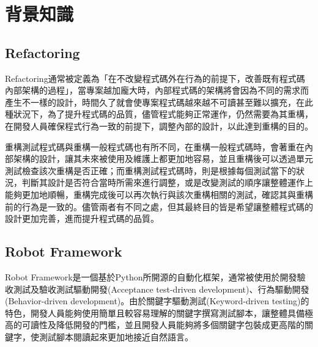 \chapter{背景知識}

\section{Refactoring}
\indent
Refactoring\cite{RefactoringBook}通常被定義為「在不改變程式碼外在行為的前提下，改善既有程式碼內部架構的過程」，當專案越加龐大時，內部程式碼的架構將會因為不同的需求而產生不一樣的設計，時間久了就會使專案程式碼越來越不可讀甚至難以擴充，在此種狀況下，為了提升程式碼的品質，儘管程式能夠正常運作，仍然需要為其重構，在開發人員確保程式行為一致的前提下，調整內部的設計，以此達到重構的目的。

\indent
重構測試程式碼與重構一般程式碼也有所不同，在重構一般程式碼時，會著重在內部架構的設計，讓其未來被使用及維護上都更加地容易，並且重構後可以透過單元測試檢查該次重構是否正確；而重構測試程式碼時，則是根據每個測試當下的狀況，判斷其設計是否符合當時所需來進行調整，或是改變測試的順序讓整體運作上能夠更加地順暢，重構完成後可以再次執行與該次重構相關的測試，確認其與重構前的行為是一致的。儘管兩者有不同之處，但其最終目的皆是希望讓整體程式碼的設計更加完善，進而提升程式碼的品質。

%

\section{Robot Framework}\label{s2.2}
\indent
Robot Framework是一個基於Python\cite{python}所開源的自動化框架，通常被使用於開發驗收測試及驗收測試驅動開發(Acceptance test-driven development)\cite{ATDD}、行為驅動開發(Behavior-driven development)\cite{BDD}。由於關鍵字驅動測試(Keyword-driven testing)\cite{robotframework}的特色，開發人員能夠使用簡單且較容易理解的關鍵字撰寫測試腳本，讓整體具備極高的可讀性及降低開發的門檻，並且開發人員能夠將多個關鍵字包裝成更高階的關鍵字，使測試腳本閱讀起來更加地接近自然語言。

